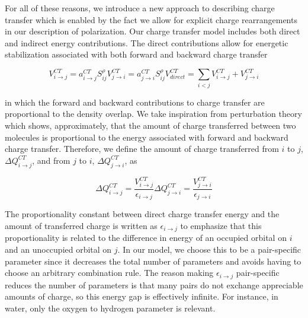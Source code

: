 \documentclass[journal=jctcce,manuscript=article]{achemso}
\begin{document}
For all of these reasons, we introduce a new approach to describing charge transfer
which is enabled by the fact we allow for explicit charge rearrangements in our
description of polarization. Our charge transfer model includes both direct and
indirect energy contributions. The direct contributions allow for energetic stabilization
associated with both forward and backward charge transfer

\begin{subequations}
  \begin{equation}
  V^{CT}_{i\rightarrow j}=a_{i\rightarrow j}^{CT}S_{ij}^\rho
\end{equation}
\begin{equation}
  V^{CT}_{j\rightarrow i}=a_{j\rightarrow i}^{CT}S_{ij}^\rho
\end{equation}
\begin{equation}
  V^{CT}_{direct}=\sum_{i<j}V^{CT}_{i\rightarrow j}+V^{CT}_{j\rightarrow i}
\end{equation}
  \label{eq:ct_direct}
\end{subequations}

in which the forward and backward contributions to
charge transfer are proportional to the density overlap. We take inspiration from perturbation theory which shows, approximately, that
the amount of charge transferred between two molecules is proportional to the
energy associated with forward and backward charge transfer.\cite{khaliullin2007unravelling,khaliullin2008analysis,khaliullin2009electron}
Therefore, we define the amount of charge transferred from $i$ to $j$, $\Delta Q^{CT}_{i\rightarrow j}$,
and from $j$ to $i$, $\Delta Q^{CT}_{j\rightarrow i}$, as

\begin{subequations}
  \begin{equation}
  \Delta Q^{CT}_{i\rightarrow j}=\frac{V^{CT}_{i\rightarrow j}}{\epsilon_{i\rightarrow j}}
    \label{eq:ct_forward}
\end{equation}
\begin{equation}
  \Delta Q^{CT}_{j\rightarrow i}=\frac{V^{CT}_{j\rightarrow i}}{\epsilon_{j\rightarrow i}}
\end{equation}
\end{subequations}

The proportionality constant between direct charge transfer energy and the amount of transferred charge is written as $\epsilon_{i\rightarrow j}$ to emphasize that this proportionality is related to the difference in energy of an occupied orbital on $i$ and an unoccupied orbital on $j$.\cite{khaliullin2007unravelling} In our model, we choose this to be a pair-specific parameter since it decreases the total number of parameters and avoids having to choose an arbitrary combination rule. The reason making $\epsilon_{i\rightarrow j}$ pair-specific reduces the number of parameters is that many pairs do not exchange appreciable amounts of charge, so this energy gap is effectively infinite. For instance, in water, only the oxygen to hydrogen parameter is relevant.
\end{document}
